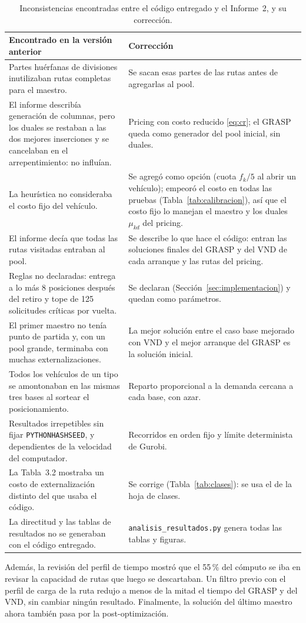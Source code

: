 \begin{table}[htbp]
\centering
\caption{Inconsistencias encontradas entre el código entregado y el Informe~2, y su corrección.}\label{tab:auditoria}
\footnotesize
\begin{tabularx}{\textwidth}{YY}
\toprule
Encontrado en la versión anterior & Corrección \\
\midrule
Partes huérfanas de divisiones inutilizaban rutas completas para el maestro. & Se sacan esas partes de las rutas antes de agregarlas al pool. \\
El informe describía generación de columnas, pero los duales se restaban a las dos mejores inserciones y se cancelaban en el arrepentimiento: no influían. & Pricing con costo reducido \eqref{eq:cr}; el GRASP queda como generador del pool inicial, sin duales. \\
La heurística no consideraba el costo fijo del vehículo. & Se agregó como opción (cuota $f_k/5$ al abrir un vehículo); empeoró el costo en todas las pruebas (Tabla~\ref{tab:calibracion}), así que el costo fijo lo manejan el maestro y los duales $\mu_{kd}$ del pricing. \\
El informe decía que todas las rutas visitadas entraban al pool. & Se describe lo que hace el código: entran las soluciones finales del GRASP y del VND de cada arranque y las rutas del pricing. \\
Reglas no declaradas: entrega a lo más 8 posiciones después del retiro y tope de 125 solicitudes críticas por vuelta. & Se declaran (Sección~\ref{sec:implementacion}) y quedan como parámetros. \\
El primer maestro no tenía punto de partida y, con un pool grande, terminaba con muchas externalizaciones. & La mejor solución entre el caso base mejorado con VND y el mejor arranque del GRASP es la solución inicial. \\
Todos los vehículos de un tipo se amontonaban en las mismas tres bases al sortear el posicionamiento. & Reparto proporcional a la demanda cercana a cada base, con azar. \\
Resultados irrepetibles sin fijar \texttt{PYTHONHASHSEED}, y dependientes de la velocidad del computador. & Recorridos en orden fijo y límite determinista de Gurobi. \\
La Tabla~3.2 mostraba un costo de externalización distinto del que usaba el código. & Se corrige (Tabla~\ref{tab:clases}): se usa el de la hoja de clases. \\
La directitud y las tablas de resultados no se generaban con el código entregado. & \texttt{analisis\_resultados.py} genera todas las tablas y figuras. \\
\bottomrule
\end{tabularx}
\end{table}

Además, la revisión del perfil de tiempo mostró que el 55\,\% del cómputo se iba en revisar la capacidad de rutas que luego se descartaban. Un filtro previo con el perfil de carga de la ruta redujo a menos de la mitad el tiempo del GRASP y del VND, sin cambiar ningún resultado. Finalmente, la solución del último maestro ahora también pasa por la post-optimización.
